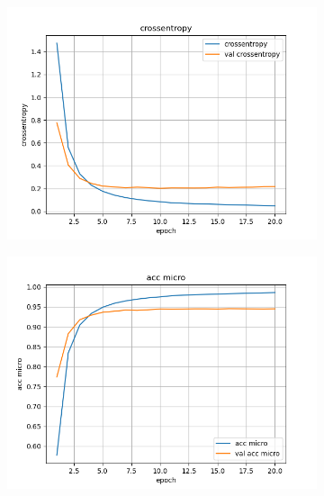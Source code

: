 \documentclass[a4paper]{article}
\begin{document}
\begin{figure}[H]
    \centering
    \begin{subfigure}{0.32\textwidth}
        \centering
        \includegraphics[width=\linewidth]{../logs/get_pos_French/crossentropy.png}
    \end{subfigure}
    \begin{subfigure}{0.32\textwidth}
        \centering
        \includegraphics[width=\linewidth]{../logs/get_pos_French/acc micro.png}
    \end{subfigure}
    \begin{subfigure}{0.32\textwidth}
        \centering

\end{subfigure}
\end{figure}
\end{document}
